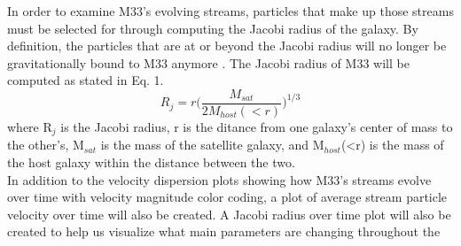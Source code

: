 \documentclass[preprint2]{aastex7}
\begin{document}
In order to examine M33's evolving streams, particles that make up those streams must be selected for through computing the Jacobi radius of the galaxy. By definition, the particles that are at or beyond the Jacobi radius will no longer be gravitationally bound to M33 anymore \citep{Read2005TheTS}. The Jacobi radius of M33 will be computed as stated in Eq. 1.
\begin{equation} \label{eq:1}
    R_j = r  \bigg( \frac{M_{sat}}{2 M_{host}(<r)} \bigg)^{1/3}
\end{equation}
\newline
where R$_{j}$ is the Jacobi radius, r is the ditance from one galaxy's center of mass to the other's, M$_{sat}$ is the mass of the satellite galaxy, and M$_{host}$(<r) is the mass of the host galaxy within the distance between the two.\\
In addition to the velocity dispersion plots showing how M33's streams evolve over time with velocity magnitude color coding, a plot of average stream particle velocity over time will also be created. A Jacobi radius over time plot will also be created to help us visualize what main parameters are changing throughout the\\
\newline
\newline
\newline
\newline
\newline
\newline
\newline
\newline
\newline
\newline
\newline
\newline
\newline
\newline
\newline
\newline
\newline
\newline
\newline
\newline
\newline
\newline
\newline
\newline
\newline
\newline
\newline
\newline
\end{document}
